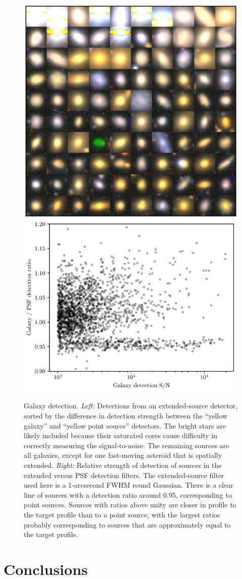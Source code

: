 \documentclass[11pt,letterpaper,linenumbers]{aastex63}
\begin{document}
\begin{figure}
  \begin{center}
    \includegraphics[height=0.4\textwidth]{galaxies}
    \includegraphics[height=0.4\textwidth]{galaxies-relsn}
    \caption{Galaxy detection.  \emph{Left:} Detections from an extended-source detector,
      sorted by the difference in detection strength between the
      ``yellow galaxy'' and ``yellow point source'' detectors.  The
      bright stars are likely included because their saturated cores
      cause difficulty in correctly measuring the signal-to-noise.
      The remaining sources are all galaxies, except for one
      fast-moving asteroid that is spatially extended.  \emph{Right:}
      Relative strength of detection of sources in the extended versus
      PSF detection filters.  The extended-source filter used here is
      a 1-arcsecond FWHM round Gaussian.  There is a clear line of
      sources with a detection ratio around 0.95, corresponding to
      point sources.  Sources with ratios above unity are closer in
      profile to the target profile than to a point source, with the
      largest ratios probably corresponding to sources that are
      approximately equal to the target profile.
      \label{fig:gals}}
  \end{center}
\end{figure}



\section{Conclusions}
\end{document}
